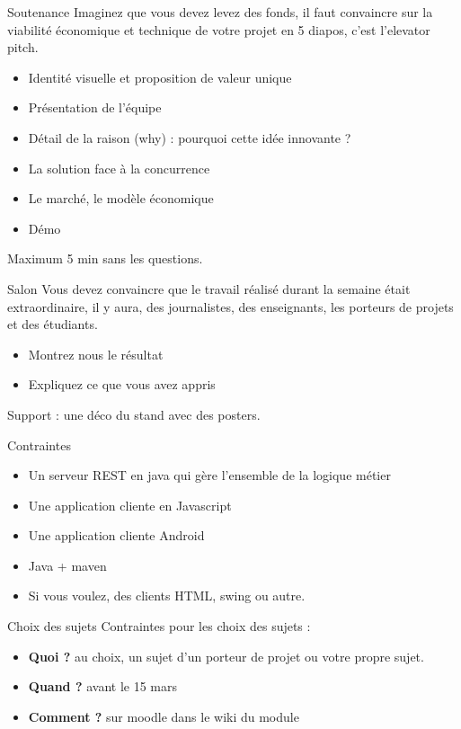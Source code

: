 \documentclass{beamer}
\begin{document}
\begin{frame}{Soutenance}
  Imaginez que vous devez levez des fonds, il faut convaincre sur la viabilité économique et technique de votre projet en 5 diapos, c'est l'elevator pitch.
  \begin{itemize}
    \item Identité visuelle et proposition de valeur unique
    \item Présentation de l'équipe
    \item Détail de la raison (why) : pourquoi cette idée innovante ?
    \item La solution face à la concurrence
    \item Le marché, le modèle économique
    \item Démo
  \end{itemize}

  Maximum 5 min sans les questions.
\end{frame}

\begin{frame}{Salon}
  Vous devez convaincre que le travail réalisé durant la semaine était extraordinaire, il y aura, des journalistes, des enseignants, les porteurs de projets et des étudiants.
  \begin{itemize}
    \item Montrez nous le résultat
    \item Expliquez ce que vous avez appris
  \end{itemize}

  Support : une déco du stand avec des posters.

\end{frame}

\begin{frame}{Contraintes}
  \begin{itemize}
    \item Un serveur REST en java qui gère l'ensemble de la logique métier
    \item Une application cliente en Javascript
    \item Une application cliente Android
    \item Java + maven
    \item Si vous voulez, des clients HTML, swing ou autre.
  \end{itemize}
\end{frame}

\begin{frame}{Choix des sujets}
  Contraintes pour les choix des sujets : 
  \begin{itemize}
    \item \textbf{Quoi ?} au choix, un sujet d'un porteur de projet ou votre propre sujet.
    \item \textbf{Quand ?} avant le 15 mars
    \item \textbf{Comment ?} sur moodle dans le wiki du module
  \end{itemize}
\end{frame}
\end{document}
